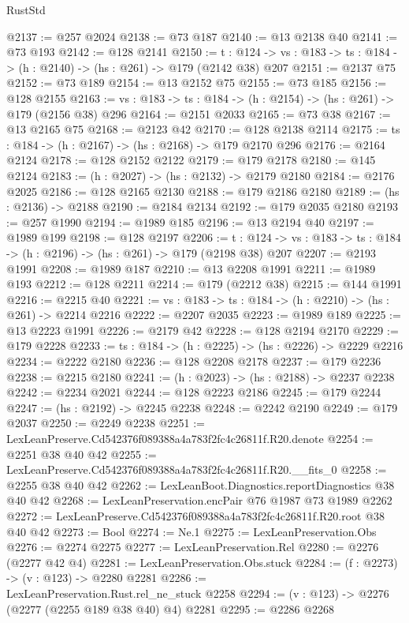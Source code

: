 \begin{lexlean}{RustStd}
\begin{coremodule}
@2137 := @257 @2024
@2138 := @73 @187
@2140 := @13 @2138 @40
@2141 := @73 @193
@2142 := @128 @2141
@2150 := {t : @124} ->
  {vs : @183} -> {ts : @184} -> (h : @2140) -> (hs : @261) -> @179 (@2142 @38) @207
@2151 := @2137 @75
@2152 := @73 @189
@2154 := @13 @2152 @75
@2155 := @73 @185
@2156 := @128 @2155
@2163 := {vs : @183} -> {ts : @184} -> (h : @2154) -> (hs : @261) -> @179 (@2156 @38) @296
@2164 := @2151 @2033
@2165 := @73 @38
@2167 := @13 @2165 @75
@2168 := @2123 @42
@2170 := @128 @2138 @2114
@2175 := {ts : @184} -> (h : @2167) -> (hs : @2168) -> @179 @2170 @296
@2176 := @2164 @2124
@2178 := @128 @2152 @2122
@2179 := @179 @2178
@2180 := @145 @2124
@2183 := (h : @2027) -> (hs : @2132) -> @2179 @2180
@2184 := @2176 @2025
@2186 := @128 @2165 @2130
@2188 := @179 @2186 @2180
@2189 := (hs : @2136) -> @2188
@2190 := @2184 @2134
@2192 := @179 @2035 @2180
@2193 := @257 @1990
@2194 := @1989 @185
@2196 := @13 @2194 @40
@2197 := @1989 @199
@2198 := @128 @2197
@2206 := {t : @124} ->
  {vs : @183} -> {ts : @184} -> (h : @2196) -> (hs : @261) -> @179 (@2198 @38) @207
@2207 := @2193 @1991
@2208 := @1989 @187
@2210 := @13 @2208 @1991
@2211 := @1989 @193
@2212 := @128 @2211
@2214 := @179 (@2212 @38)
@2215 := @144 @1991
@2216 := @2215 @40
@2221 := {vs : @183} -> {ts : @184} -> (h : @2210) -> (hs : @261) -> @2214 @2216
@2222 := @2207 @2035
@2223 := @1989 @189
@2225 := @13 @2223 @1991
@2226 := @2179 @42
@2228 := @128 @2194 @2170
@2229 := @179 @2228
@2233 := {ts : @184} -> (h : @2225) -> (hs : @2226) -> @2229 @2216
@2234 := @2222 @2180
@2236 := @128 @2208 @2178
@2237 := @179 @2236
@2238 := @2215 @2180
@2241 := (h : @2023) -> (hs : @2188) -> @2237 @2238
@2242 := @2234 @2021
@2244 := @128 @2223 @2186
@2245 := @179 @2244
@2247 := (hs : @2192) -> @2245 @2238
@2248 := @2242 @2190
@2249 := @179 @2037
@2250 := @2249 @2238
@2251 := LexLeanPreserve.Cd542376f089388a4a783f2fc4c26811f.R20.denote
@2254 := @2251 @38 @40 @42
@2255 := LexLeanPreserve.Cd542376f089388a4a783f2fc4c26811f.R20.__fits_0
@2258 := @2255 @38 @40 @42
@2262 := LexLeanBoot.Diagnostics.reportDiagnostics @38 @40 @42
@2268 := LexLeanPreservation.encPair @76 @1987 @73 @1989 @2262
@2272 := LexLeanPreserve.Cd542376f089388a4a783f2fc4c26811f.R20.root @38 @40 @42
@2273 := Bool
@2274 := Ne.{1}
@2275 := LexLeanPreservation.Obs
@2276 := @2274 @2275
@2277 := LexLeanPreservation.Rel
@2280 := @2276 (@2277 @42 @4)
@2281 := LexLeanPreservation.Obs.stuck
@2284 := (f : @2273) -> (v : @123) -> @2280 @2281
@2286 := LexLeanPreservation.Rust.rel_ne_stuck @2258
@2294 := (v : @123) -> @2276 (@2277 (@2255 @189 @38 @40) @4) @2281
@2295 := @2286 @2268

\end{coremodule}
\end{lexlean}

